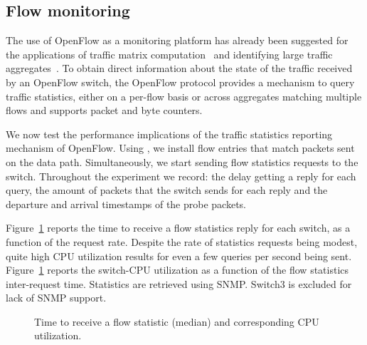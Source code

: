 \subsection{Flow monitoring}\label{sec:results-monitoring}

The use of OpenFlow as a monitoring platform has already been
suggested for the applications of traffic matrix
computation~\cite{opentm-pam,tm-presto} and identifying large traffic
aggregates~\cite{openflow-measurement-hotice}. To obtain direct
information about the state of the traffic received by an OpenFlow
switch, the OpenFlow protocol provides a mechanism to query traffic
statistics, either on a per-flow basis or across aggregates matching
multiple flows and supports packet and byte counters. 

We now test the performance implications of the traffic statistics reporting 
mechanism of OpenFlow. Using \oflops, we install flow entries that match 
packets sent on the data path. Simultaneously, we start sending flow statistics 
requests to the switch. Throughout the experiment we record: the delay getting 
a reply for each query, the amount of packets that the switch sends for each 
reply and the departure and arrival timestamps of the probe packets.

Figure~\ref{fig:stat_request} reports the time to receive a flow
statistics reply for each switch, as a function of the request
rate. Despite the rate of statistics requests being modest, quite high
CPU utilization results for even a few queries per second being
sent. Figure~\ref{fig:stat_request} reports the switch-CPU utilization
as a function of the flow statistics inter-request time. Statistics
are retrieved using SNMP. Switch3 is excluded for lack of SNMP
support.

\begin{figure}[h]
  \begin{center}
  \end{center}
  \caption{Time to receive a flow statistic (median) and corresponding CPU utilization.}
  \label{fig:stat_request}
\end{figure}

